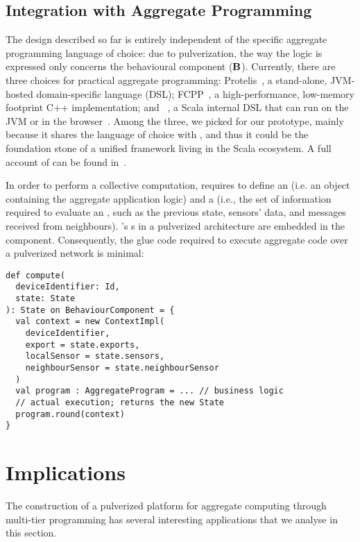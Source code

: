 \subsection{Integration with Aggregate Programming}
\label{scafiloci}

The design described so far is entirely independent of the specific aggregate programming language of choice:
due to pulverization, the way the logic is expressed only concerns the behavioural component ($\mathbf{B}$).
%
Currently, there are three choices for practical aggregate programming:
Protelis~\cite{PianiniSAC2015}, a stand-alone, JVM-hosted domain-specific language (DSL);
FCPP~\cite{DBLP:conf/acsos/Audrito20}, a high-performance, low-memory footprint C++ implementation;
and \scafi{}~\cite{DBLP:conf/isola/CasadeiVAD20}, a Scala internal DSL that can run on the JVM or in the browser~\cite{DBLP:conf/coordination/AguzziCMPV21}.
%
Among the three, we picked \scafi{} for our prototype,
mainly because it shares the language of choice with \scalaloci{},
and thus it could be the foundation stone of a unified framework living in the Scala ecosystem.  A full account of \scafi{} can be found in~\cite{DBLP:journals/eaai/CasadeiVAPD21}.

In order to perform a collective computation, \scafi{} requires to define an  (i.e. an object containing the aggregate application logic) and 
a  (i.e., the set of information required to evaluate an , such as the previous state, sensors' data, and messages received from neighbours).
%
\scafi{}'s s in a pulverized architecture are embedded in the  component.
%
Consequently, the glue code required to execute \scafi{} aggregate code over a pulverized network is minimal:
\begin{verbatim}
def compute(
  deviceIdentifier: Id,
  state: State
): State on BehaviourComponent = {
  val context = new ContextImpl(
    deviceIdentifier,
    export = state.exports,
    localSensor = state.sensors,
    neighbourSensor = state.neighbourSensor
  )
  val program : AggregateProgram = ... // business logic
  // actual execution; returns the new State
  program.round(context)
}
\end{verbatim}
\section{Implications}
\label{implicitation}
The construction of a pulverized platform for aggregate computing through multi-tier programming has several interesting applications that we analyse in this section.

